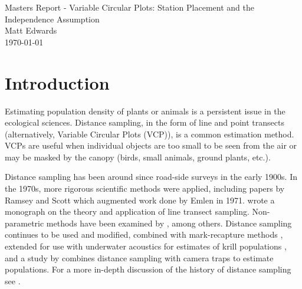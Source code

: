 \documentclass[12pt]{article}
\begin{document}
%
%
\begingroup  
  \centering
  \LARGE Masters Report - Variable Circular Plots: Station Placement and the Independence Assumption\\[1em]
  \large Matt Edwards\\
  \today\par
\endgroup

\section{Introduction}
Estimating population density of plants or animals is a persistent issue in the ecological sciences. Distance sampling, in the form of line and point transects (alternatively, Variable Circular Plots (VCP)), is a common estimation method. VCPs are useful when individual objects are too small to be seen from the air or may be masked by the canopy (birds, small animals, ground plants, etc.).

Distance sampling has been around since road-side surveys in the early 1900s. In the 1970s, more rigorous scientific methods were applied, including papers by Ramsey and Scott \parencite*{ramsey1979,ramsey1981} which augmented work done by Emlen in 1971. \textcite{burnham1980} wrote a monograph on the theory and application of line transect sampling. Non-parametric methods have been examined by \textcite{quang1993,mack1998}, among others. Distance sampling continues to be used and modified, combined with mark-recapture methods \parencite{laake2011}, extended for use with underwater acoustics for estimates of krill populations \parencite{krill2011}, and a study by \textcite{camera2011} combines distance sampling with camera traps to estimate populations. For a more in-depth discussion of the history of distance sampling see \textcite{buckland2001}. 
\end{document}
